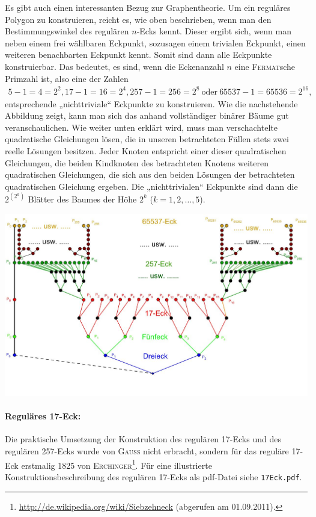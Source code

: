 \documentclass[11pt]{article}
\newcommand{\br}[1]{\ensuremath{\left(#1\right)}}
\begin{document}
Es gibt auch einen interessanten Bezug zur Graphentheorie. Um ein reguläres
Polygon zu konstruieren, reicht es, wie oben beschrieben, wenn man den
Bestimmungswinkel des regulären $n$-Ecks kennt. Dieser ergibt sich, wenn man
neben einem frei wählbaren Eckpunkt, sozusagen einem trivialen Eckpunkt, einen
weiteren benachbarten Eckpunkt kennt. Somit sind dann alle Eckpunkte
konstruierbar. Das bedeutet, es sind, wenn die Eckenanzahl $n$ eine
\textsc{Fermat}sche Primzahl ist, also eine der Zahlen 
\begin{gather*}
  5-1=4=2^2, 17-1=16=2^4, 257-1=256=2^8\ \text{oder}\ 65537-1=65536=2^{16},
\end{gather*}
entsprechende „nichttriviale“ Eckpunkte zu konstruieren. Wie die nachstehende
Abbildung zeigt, kann man sich das anhand vollständiger binärer Bäume gut
veranschaulichen. Wie weiter unten erklärt wird, muss man verschachtelte
quadratische Gleichungen lösen, die in unseren betrachteten Fällen stets zwei
reelle Lösungen besitzen. Jeder Knoten entspricht einer dieser quadratischen
Gleichungen, die beiden Kindknoten des betrachteten Knotens weiteren
quadratischen Gleichungen, die sich aus den beiden Lösungen der betrachteten
quadratischen Gleichung ergeben. Die „nichttrivialen“ Eckpunkte sind dann die
$2^{\br{2^k}}$ Blätter des Baumes der Höhe $2^k$ ($k = 1,2,\ldots,5$).
\begin{center}
  \includegraphics[width=.7\textwidth]{Baum.jpg}
\end{center}

\paragraph{Reguläres 17-Eck:}
Die praktische Umsetzung der Konstruktion des regulären 17-Ecks und des
regulären 257-Ecks wurde von \textsc{Gauss} nicht erbracht, sondern für das
reguläre 17-Eck erstmalig 1825 von
\textsc{Erchinger}\footnote{\url{http://de.wikipedia.org/wiki/Siebzehneck}
  (abgerufen am 01.09.2011).}. Für eine illustrierte Konstruktionsbeschreibung
des regulären 17-Ecks als pdf-Datei siehe \texttt{17Eck.pdf}.
\end{document}
